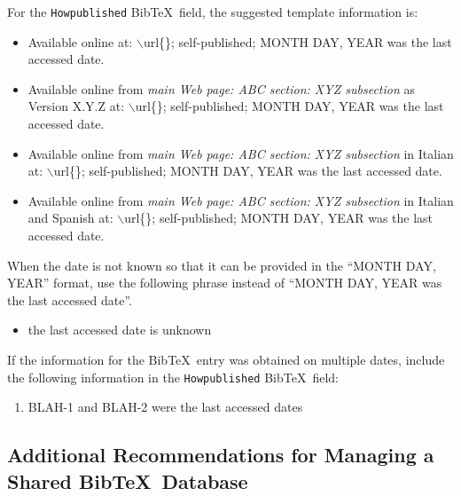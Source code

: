 \documentclass[letter,12pt]{article}
\begin{document}
For the {\tt Howpublished} {\sc Bib}\TeX\ field, the suggested template information is: \vspace{-0.3cm}
\begin{itemize} \itemsep -4pt
\item Available online at: $\backslash$url\{\}; self-published; MONTH DAY, YEAR was the last accessed date.
\item Available online from {\it main Web page: ABC section: XYZ subsection} as Version X.Y.Z at: $\backslash$url\{\}; self-published; MONTH DAY, YEAR was the last accessed date.
\item Available online from {\it main Web page: ABC section: XYZ subsection} in Italian at: $\backslash$url\{\}; self-published; MONTH DAY, YEAR was the last accessed date.
\item Available online from {\it main Web page: ABC section: XYZ subsection} in Italian and Spanish at: $\backslash$url\{\}; self-published; MONTH DAY, YEAR was the last accessed date.
\end{itemize}

When the date is not known so that it can be provided in the ``MONTH DAY, YEAR'' format, use the following phrase instead of ``MONTH DAY, YEAR was the last accessed date''. \vspace{-0.3cm}
\begin{itemize} \itemsep -4pt
\item the last accessed date is unknown
\end{itemize}


If the information for the {\sc Bib}\TeX\ entry was obtained on multiple dates, include the following information in the {\tt Howpublished} {\sc Bib}\TeX\ field: \vspace{-0.3cm}
\begin{enumerate} \itemsep -4pt
\item BLAH-1 and BLAH-2 were the last accessed dates
\end{enumerate}









\subsection{Additional Recommendations for Managing a Shared {\sc Bib}\TeX\ Database}
\label{ssec:AdditionalRecommendationsForManagingASharedBibTeXDatabase}
\end{document}
